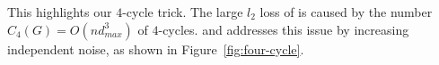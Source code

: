 This highlights our $4$-cycle trick.
The large $l_2$ loss of \AlgOne{} is caused by the number $C_4(G) = O(n d_{max}^3)$ of $4$-cycles.
\AlgTwo{} and \AlgThree{} addresses this issue by increasing independent noise, as shown in Figure~\ref{fig:four-cycle}.



